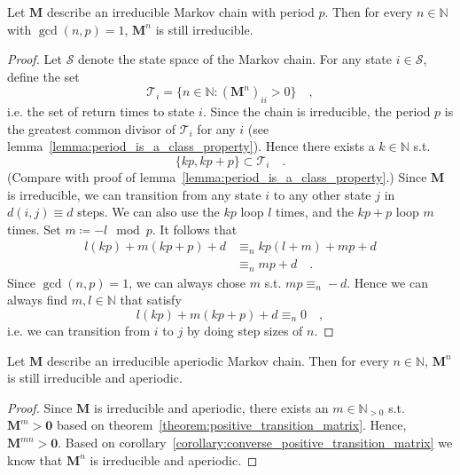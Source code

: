 \documentclass[../../main.tex]{subfiles}
\begin{document}
    \begin{lemma}
        \label{lemma:periodic_irreducible_stays_irreducible}
        Let $\bm{M}$ describe an irreducible Markov chain with period $p$. Then for every $n \in \mathbb{N}$ with $\gcd(n, p) = 1$, $\bm{M}^n$ is still irreducible.
    \end{lemma}
    \vspace{-2.5em}
    \begin{proof}
        Let $\mathcal{S}$ denote the state space of the Markov chain. For any state $i \in \mathcal{S}$, define the set
        \[
            \mathcal{T}_i = \{ n \in \mathbb{N} : (\bm{M}^n)_{ii} > 0 \} \quad ,
        \]
        i.e. the set of return times to state $i$. Since the chain is irreducible, the period $p$ is the greatest common divisor of $\mathcal{T}_i$ for any $i$ (see lemma~\ref{lemma:period_is_a_class_property}). Hence there exists a $k \in \mathbb{N}$ s.t.
        \[
            \{kp, kp + p\} \subset \mathcal{T}_i \quad .
        \]
        (Compare with proof of lemma~\ref{lemma:period_is_a_class_property}.) Since $\bm{M}$ is irreducible, we can transition from any state $i$ to any other state $j$ in $d(i, j) \equiv d$ steps. We can also use the $kp$ loop $l$ times, and the $kp + p$ loop $m$ times. Set $m \coloneqq -l \mod p$. It follows that
        \begin{align*}
            l(kp) + m(kp+p) + d &\equiv_n kp(l+m) + mp + d \\
            &\equiv_n mp + d \quad .
        \end{align*}
        Since $\gcd(n,p) = 1$, we can always chose $m$ s.t. $mp \equiv_n -d$. Hence we can always find $m, l \in \mathbb{N}$ that satisfy
        \[
            l(kp) + m(kp+p) + d \equiv_n 0 \quad ,
        \]
        i.e. we can transition from $i$ to $j$ by doing step sizes of $n$.
    \end{proof}

    \begin{lemma}
        \label{lemma:aperiodic_irreducible_stays_aperiodic}
        Let $\bm{M}$ describe an irreducible aperiodic Markov chain. Then for every $n \in \mathbb{N}$, $\bm{M}^n$ is still irreducible and aperiodic.
    \end{lemma}
    \vspace{-2.5em}
    \begin{proof}
        Since $\bm{M}$ is irreducible and aperiodic, there exists an $m \in \mathbb{N}_{>0}$ s.t. $\bm{M}^m > \bm{0}$ based on theorem~\ref{theorem:positive_transition_matrix}. Hence, $\bm{M}^{mn} > \bm{0}$. Based on corollary~\ref{corollary:converse_positive_transition_matrix} we know that $\bm{M}^n$ is irreducible and aperiodic.
    \end{proof}
\end{document}
